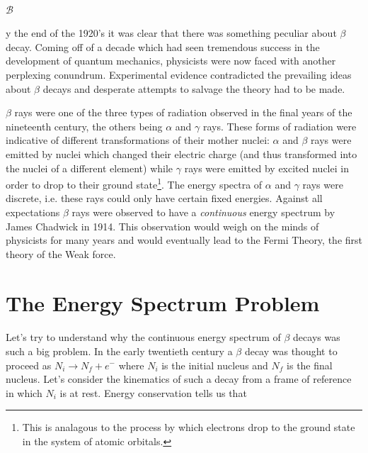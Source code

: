 \documentclass[a4paper,12pt]{book}
\begin{document}
\paragraph*{}\begin{Large}$\mathcal{B}$\end{Large}y the end of the 1920's it was clear that there was something peculiar about $\beta$ decay. Coming off of a decade which had seen tremendous success in the development of quantum mechanics, physicists were now faced with another perplexing conundrum. Experimental evidence contradicted the prevailing ideas about $\beta$ decays and desperate attempts to salvage the theory had to be made.

$\beta$ rays were one of the three types of radiation observed in the final years of the nineteenth century, the others being $\alpha$ and $\gamma$ rays. These forms of radiation were indicative of different transformations of their mother nuclei: $\alpha$ and $\beta$ rays were emitted by nuclei which changed their electric charge (and thus transformed into the nuclei of a different element) while $\gamma$ rays were emitted by excited nuclei in order to drop to their ground state\footnote{This is analagous to the process by which electrons drop to the ground state in the system of atomic orbitals.}. The energy spectra of $\alpha$ and $\gamma$ rays were discrete, i.e. these rays could only have certain fixed energies. Against all expectations $\beta$ rays were observed to have a \emph{continuous} energy spectrum by James Chadwick in 1914. This observation would weigh on the minds of physicists for many years and would eventually lead to the Fermi Theory, the first theory of the Weak force.

\section{The Energy Spectrum Problem}

\paragraph*{}Let's try to understand why the continuous energy spectrum of $\beta$ decays was such a big problem. In the early twentieth century a $\beta$ decay was thought to proceed as $N_{i}\longrightarrow N_{f}+e^{-}$ where $N_{i}$ is the initial nucleus and $N_{f}$ is the final nucleus. Let's consider the kinematics of such a decay from a frame of reference in which $N_{i}$ is at rest. Energy conservation tells us that
\end{document}
